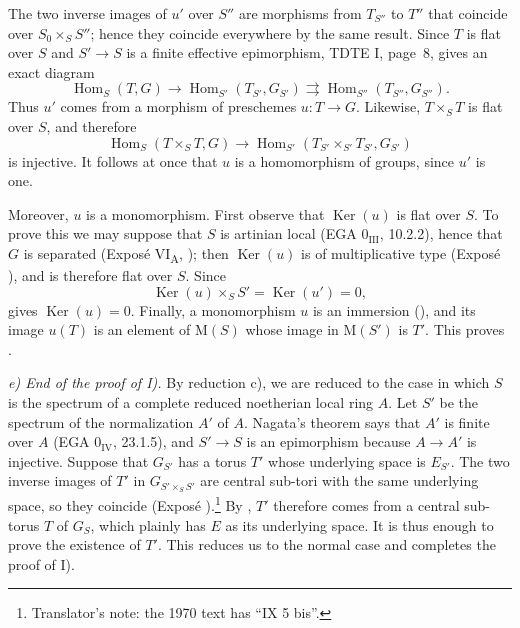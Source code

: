 The two inverse images of \(u'\) over \(S''\) are morphisms from
\(T_{S''}\) to \(T''\) that coincide over \(S_0\times_S S''\);
hence they coincide everywhere by the same result. Since \(T\) is
flat over \(S\) and \(S'\to S\) is a finite effective
epimorphism, TDTE I, page~8, gives an exact diagram
\[
  \operatorname{Hom}_S(T,G)\longrightarrow
  \operatorname{Hom}_{S'}(T_{S'},G_{S'})
  \rightrightarrows
  \operatorname{Hom}_{S''}(T_{S''},G_{S''}).
\]
Thus \(u'\) comes from a morphism of preschemes \(u:T\to G\).
Likewise, \(T\times_S T\) is flat over \(S\), and therefore
\[
  \operatorname{Hom}_S(T\times_S T,G)\longrightarrow
  \operatorname{Hom}_{S'}(T_{S'}\times_{S'}T_{S'},G_{S'})
\]
is injective. It follows at once that \(u\) is a homomorphism of
groups, since \(u'\) is one.

Moreover, \(u\) is a monomorphism. First observe that
\(\operatorname{Ker}(u)\) is flat over \(S\). To prove this we may
suppose that \(S\) is artinian local (EGA
\(0_{\mathrm{III}}\), 10.2.2), hence that \(G\) is separated
(Exposé VI\textsubscript{A}, ); then
\(\operatorname{Ker}(u)\) is of multiplicative type (Exposé
), and is therefore flat over \(S\). Since
\[
  \operatorname{Ker}(u)\times_S S'
    =\operatorname{Ker}(u')=0,
\]
 gives \(\operatorname{Ker}(u)=0\). Finally, a
monomorphism \(u\) is an immersion (),
and its image \(u(T)\) is an element of \(\mathrm M(S)\) whose
image in \(\mathrm M(S')\) is \(T'\). This proves .

\smallskip
\noindent\textit{e) End of the proof of I).}\quad
By reduction c), we are reduced to the case in which \(S\) is the
spectrum of a complete reduced noetherian local ring \(A\). Let
\(S'\) be the spectrum of the normalization \(A'\) of \(A\).
Nagata's theorem says that \(A'\) is finite over \(A\) (EGA
\(0_{\mathrm{IV}}\), 23.1.5), and \(S'\to S\) is an epimorphism
because \(A\to A'\) is injective. Suppose that \(G_{S'}\) has a
torus \(T'\) whose underlying space is \(E_{S'}\). The two inverse
images of \(T'\) in \(G_{S'\times_S S'}\) are central sub-tori
with the same underlying space, so they coincide (Exposé
).\footnote{Translator's note: the 1970 text has
``IX 5 bis''.} By , \(T'\) therefore comes from a central
sub-torus \(T\) of \(G_S\), which plainly has \(E\) as its
underlying space. It is thus enough to prove the existence of
\(T'\). This reduces us to the normal case and completes the proof
of I).

